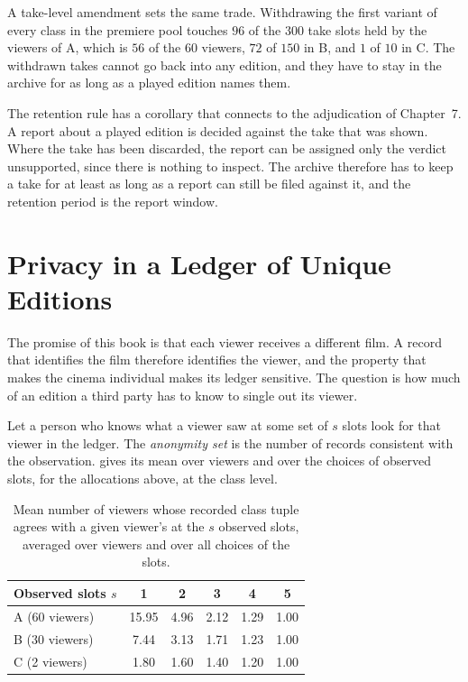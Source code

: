 \documentclass[11pt,twoside,openright]{book}
\theoremstyle{plain}
\theoremstyle{definition}
\theoremstyle{remark}
\begin{document}
A take-level amendment sets the same trade. Withdrawing the first variant of every class in the premiere pool touches $96$ of the $300$ take slots held by the viewers of A, which is $56$ of the $60$ viewers, $72$ of $150$ in B, and $1$ of $10$ in C. The withdrawn takes cannot go back into any edition, and they have to stay in the archive for as long as a played edition names them.

The retention rule has a corollary that connects to the adjudication of Chapter~7. A report about a played edition is decided against the take that was shown. Where the take has been discarded, the report can be assigned only the verdict unsupported, since there is nothing to inspect. The archive therefore has to keep a take for at least as long as a report can still be filed against it, and the retention period is the report window.

\section{Privacy in a Ledger of Unique Editions}\label{sec:privacy}

The promise of this book is that each viewer receives a different film. A record that identifies the film therefore identifies the viewer, and the property that makes the cinema individual makes its ledger sensitive. The question is how much of an edition a third party has to know to single out its viewer.

Let a person who knows what a viewer saw at some set of $s$ slots look for that viewer in the ledger. The \emph{anonymity set} is the number of records consistent with the observation.  gives its mean over viewers and over the choices of observed slots, for the allocations above, at the class level.

\begin{table}[ht]
\centering
\begin{tabular}{@{}lccccc@{}}
\toprule
Observed slots $s$ & 1 & 2 & 3 & 4 & 5\\
\midrule
A (60 viewers) & 15.95 & 4.96 & 2.12 & 1.29 & 1.00\\
B (30 viewers) & 7.44 & 3.13 & 1.71 & 1.23 & 1.00\\
C (2 viewers) & 1.80 & 1.60 & 1.40 & 1.20 & 1.00\\
\bottomrule
\end{tabular}
\caption{Mean number of viewers whose recorded class tuple agrees with a given viewer's at the $s$ observed slots, averaged over viewers and over all choices of the slots.}\label{tab:anon12}
\end{table}
\end{document}
